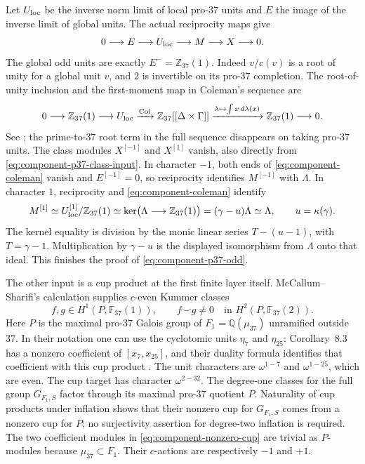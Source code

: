 \documentclass[11pt]{article}
\theoremstyle{definition}\newtheorem{definition}[theorem]{Definition}
\begin{document}
Let $U_{\rm loc}$ be the inverse norm limit of local pro-$37$ units
and $E$ the image of the inverse limit of global units.  The actual
reciprocity maps give
\[
 0\longrightarrow E\longrightarrow U_{\rm loc}
 \longrightarrow M\longrightarrow X\longrightarrow0.
\]
The global odd units are exactly $E^-=\mathbb Z_{37}(1)$.
Indeed $v/c(v)$ is a root of unity for a global unit $v$, and
$2$ is invertible on its pro-$37$ completion.  The root-of-unity
inclusion and the first-moment map in Coleman's sequence are
\begin{equation}\label{eq:component-coleman}
 0\longrightarrow\mathbb Z_{37}(1)\longrightarrow U_{\rm loc}
 \xrightarrow{\operatorname{Col}}
 \mathbb Z_{37}[[\Delta\times\Gamma]]
 \xrightarrow{\lambda\mapsto\int x\,d\lambda(x)}
 \mathbb Z_{37}(1)\longrightarrow0.
\end{equation}
See \cite[Theorem~5.5.31]{SharifiIwa}; the prime-to-$37$
root term in the full sequence disappears on taking pro-$37$
units.  The class modules $X^{[-1]}$ and $X^{[1]}$ vanish, also
directly from \eqref{eq:component-p37-class-input}.  In character
$-1$, both ends of \eqref{eq:component-coleman} vanish and $E^{[-1]}=0$,
so reciprocity identifies $M^{[-1]}$ with $\Lambda$.  In character
$1$, reciprocity and \eqref{eq:component-coleman} identify
\[
 M^{[1]}\simeq U_{\rm loc}^{[1]}/\mathbb Z_{37}(1)
 \simeq\ker\bigl(\Lambda\longrightarrow\mathbb Z_{37}(1)\bigr)
 =(\gamma-u)\Lambda\simeq\Lambda,
 \qquad u=\kappa(\gamma).
\]
The kernel equality is division by the monic linear series
$T-(u-1)$, with $T=\gamma-1$.  Multiplication by $\gamma-u$ is
the displayed isomorphism from $\Lambda$ onto that ideal.  This
finishes the proof of \eqref{eq:component-p37-odd}.

The other input is a cup product at the first finite layer itself.
McCallum--Sharifi's calculation supplies $c$-even Kummer classes
\begin{equation}\label{eq:component-nonzero-cup}
 f,g\in H^1(P,\mathbb F_{37}(1)),\qquad
 f\smile g\ne0\quad\text{in }H^2(P,\mathbb F_{37}(2)).
\end{equation}
Here $P$ is the maximal pro-$37$ Galois group of
$F_1=\mathbb Q(\mu_{37})$ unramified outside $37$.
In their notation one can use the cyclotomic units $\eta_7$
and $\eta_{25}$: Corollary~8.3 has a nonzero coefficient of
$[x_7,x_{25}]$, and their duality formula identifies that
coefficient with this cup product
\cite[Theorem~7.5, p.~20; Corollary~8.3, p.~23]{MS}.
The unit characters are $\omega^{1-7}$ and $\omega^{1-25}$,
which are even.  The cup target has character $\omega^{2-32}$.
The degree-one classes for the full group $G_{F_1,S}$ factor
through its maximal pro-$37$ quotient $P$.  Naturality of cup
products under inflation shows that their nonzero cup for
$G_{F_1,S}$ comes from a nonzero cup for $P$; no surjectivity
assertion for degree-two inflation is required.
The two coefficient modules in \eqref{eq:component-nonzero-cup}
are trivial as $P$-modules because $\mu_{37}\subset F_1$.
Their $c$-actions are respectively $-1$ and $+1$.
\end{document}
